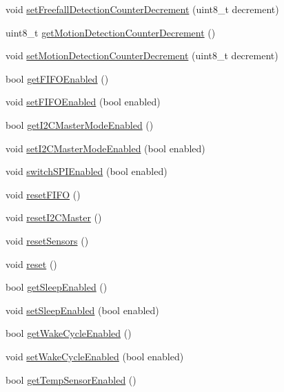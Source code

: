 \begin{DoxyCompactItemize}
void \mbox{\hyperlink{classMPU6050_a18dd79b7c53600e9ce97eed4bfe6cf15}{set\+Freefall\+Detection\+Counter\+Decrement}} (uint8\+\_\+t decrement)
\item 
uint8\+\_\+t \mbox{\hyperlink{classMPU6050_a0ed8de8eb440dbfdec829297527b0da6}{get\+Motion\+Detection\+Counter\+Decrement}} ()
\item 
void \mbox{\hyperlink{classMPU6050_a74cc3ea727afa5d4406175085e60d08c}{set\+Motion\+Detection\+Counter\+Decrement}} (uint8\+\_\+t decrement)
\item 
bool \mbox{\hyperlink{classMPU6050_ae2687a09ebe0d7fbbf74f560e0dd9a44}{get\+F\+I\+F\+O\+Enabled}} ()
\item 
void \mbox{\hyperlink{classMPU6050_a78e58ab27986db6999af775ed4d43091}{set\+F\+I\+F\+O\+Enabled}} (bool enabled)
\item 
bool \mbox{\hyperlink{classMPU6050_a6b45e538f2082eb1b1975ed56e3e21bc}{get\+I2\+C\+Master\+Mode\+Enabled}} ()
\item 
void \mbox{\hyperlink{classMPU6050_a6503f0fdfefa0fd287a75032667b7b69}{set\+I2\+C\+Master\+Mode\+Enabled}} (bool enabled)
\item 
void \mbox{\hyperlink{classMPU6050_a269710b7bca814bbf67e7bb38c381650}{switch\+S\+P\+I\+Enabled}} (bool enabled)
\item 
void \mbox{\hyperlink{classMPU6050_aafa0dc38b7ea2acd1aecd5d9df8cbd08}{reset\+F\+I\+FO}} ()
\item 
void \mbox{\hyperlink{classMPU6050_a96332c394f1b7efd44c83a4ff690e732}{reset\+I2\+C\+Master}} ()
\item 
void \mbox{\hyperlink{classMPU6050_a9a271104d3302abc4af005c69a930094}{reset\+Sensors}} ()
\item 
void \mbox{\hyperlink{classMPU6050_a7100b6d276c3c8664cf00d768b7b0dee}{reset}} ()
\item 
bool \mbox{\hyperlink{classMPU6050_a196404ef04b959083d4bf5e6f1cd8b98}{get\+Sleep\+Enabled}} ()
\item 
void \mbox{\hyperlink{classMPU6050_a15ec5f8e7daf235f507c1d8b96af051a}{set\+Sleep\+Enabled}} (bool enabled)
\item 
bool \mbox{\hyperlink{classMPU6050_a89afc5235b9088c696e2cc7841f5259a}{get\+Wake\+Cycle\+Enabled}} ()
\item 
void \mbox{\hyperlink{classMPU6050_a340eade71cf6286f6904c2021330944e}{set\+Wake\+Cycle\+Enabled}} (bool enabled)
\item 
bool \mbox{\hyperlink{classMPU6050_a31f588beab6760258212c65725eba336}{get\+Temp\+Sensor\+Enabled}} ()
\item 

\end{DoxyCompactItemize}
